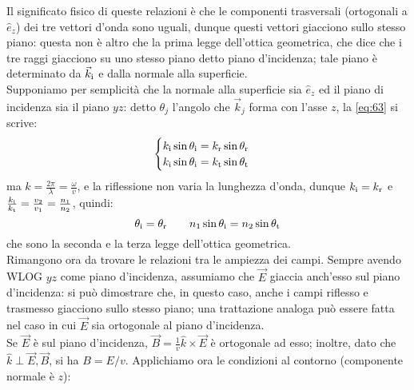 Il significato fisico di queste relazioni è che le componenti trasversali (ortogonali a $ \hat{e}_z $) dei tre vettori d'onda sono uguali, dunque questi vettori giacciono sullo stesso piano: questa non è altro che la prima legge dell'ottica geometrica, che dice che i tre raggi giacciono su uno stesso piano detto piano d'incidenza; tale piano è determinato da $ \vec{k}_{\text{i}} $ e dalla normale alla superficie. \\ 
%
Supponiamo per semplicità che la normale alla superficie sia $ \hat{e}_z $ ed il piano di incidenza sia il piano $ yz $: detto $ \theta_j $ l'angolo che $ \vec{k}_j $ forma con l'asse $ z $, la \ref{eq:63} si scrive:
\begin{equation}
	\begin{cases}
		k_{\text{i}} \sin\theta_{\text{i}} = k_{\text{r}} \sin\theta_{\text{r}} \\ 
		k_{\text{i}} \sin\theta_{\text{i}} = k_{\text{t}} \sin\theta_{\text{t}}
	\end{cases}
	\label{eq:64}
\end{equation}
ma $ k = \frac{2\pi}{\lambda} = \frac{\omega}{v} $, e la riflessione non varia la lunghezza d'onda, dunque $ k_{\text{i}} = k_{\text{r}} $ e $ \frac{k_{\text{i}}}{k_{\text{t}}} = \frac{v_2}{v_1} = \frac{n_1}{n_2} $, quindi:
\begin{equation}
	\theta_{\text{i}} = \theta_{\text{r}} \qquad n_1 \sin\theta_{\text{i}} = n_2 \sin\theta_{\text{t}}
	\label{eq:65}
\end{equation}
che sono la seconda e la terza legge dell'ottica geometrica. \\ 
%
Rimangono ora da trovare le relazioni tra le ampiezza dei campi. Sempre avendo WLOG $ yz $ come piano d'incidenza, assumiamo che $ \vec{E} $ giaccia anch'esso sul piano d'incidenza: si può dimostrare che, in questo caso, anche i campi riflesso e trasmesso giacciono sullo stesso piano; una trattazione analoga può essere fatta nel caso in cui $ \vec{E} $ sia ortogonale al piano d'incidenza. \\ 
Se $ \vec{E} $ è sul piano d'incidenza, $ \vec{B} = \frac{1}{v} \hat{k}\times\vec{E} $ è ortogonale ad esso; inoltre, dato che $ \hat{k}\perp\vec{E},\vec{B} $, si ha $ B = E / v $. Applichiamo ora le condizioni al contorno (componente normale è $ z $):
